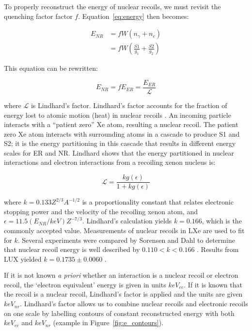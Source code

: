 To properly reconstruct the energy of nuclear recoils, we must revisit the quenching factor factor $f$. Equation~\ref{eq:energy} then becomes:

 \begin{equation}
  \label{eq:energy}
 \begin{split}
E_{NR} &= f W (n_{\gamma} + n_{e} ) \\
   &= f W (\frac{S1}{g_{1}} + \frac{S2}{g_{2}})
 \end{split}
\end{equation}

This equation can be rewritten:

 \begin{equation}
 \label{eq:combined_energy}
E_{NR} = f E_{ER} = \frac{E_{ER}}{\mathcal{L}}
\end{equation}

where $\mathcal{L}$ is Lindhard's factor. Lindhard's factor accounts for the fraction of energy lost to atomic motion (heat) in nuclear recoils \cite{Lindhard1963}. An incoming particle interacts with a ``patient zero'' Xe atom, resulting a nuclear recoil. The patient zero Xe atom interacts with surrounding atoms in a cascade to produce S1 and S2; it is the energy partitioning in this cascade that results in different energy scales for \ac{ER} and \ac{NR}. Lindhard shows that the energy partitioned in nuclear interactions and electron interactions from a recoiling xenon nucleus is:

 \begin{equation}
 \label{eq:lindhard}
\mathcal{L} = \frac{k g(\epsilon)}{1 + k g(\epsilon)}
\end{equation}

where $k = 0.133 Z^{2/3} A^{-1/2}$ is a proportionality constant that relates electronic stopping power and the velocity of the recoiling xenon atom, and $\epsilon = 11.5 (E_{NR}/keV) Z^{-7/3}$. Lindhard's calculation yields $k=0.166$, which is the commonly accepted value. Measurements of nuclear recoils in \ac{LXe} are used to fit for $k$. Several experiments were compared by Sorensen and Dahl to determine that nuclear recoil energy is well described by $0.110 < k < 0.166$ \cite{Sorensen2011}. Results from \ac{LUX} yielded $k = 0.1735 \pm 0.0060$ \cite{LUX:DD}. 


If it is not known \textit{a priori} whether an interaction is a nuclear recoil or electron recoil, the `electron equivalent' energy is given in units $keV_{ee}$. If it is known that the recoil is a nuclear recoil, Lindhard's factor is applied and the units are given $keV_{nr}$. Lindhard's factor allows us to combine nuclear recoils and electronic recoils on one scale by labelling contours of constant reconstructed energy with both $keV_{ee}$ and $keV_{nr}$ (example in Figure~\ref{fig:e_contours}).


